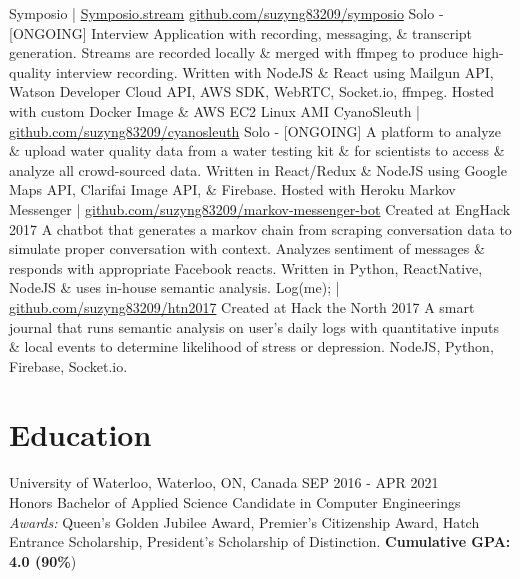 \documentclass[]{friggeri-cv}
\begin{document}
\begin{entrylist}
	\entry
	{Symposio | \href{http://symposio.stream}{\footnotesize Symposio.stream} \href{https://github.com/suzyng83209/symposio}{\footnotesize github.com/suzyng83209/symposio}}
	{\vspace{0.5\parsep}Solo - [ONGOING]}
	{Interview Application with recording, messaging, \& transcript generation. Streams are recorded locally \& merged with ffmpeg to produce high-quality interview recording. Written with NodeJS \& React using Mailgun API, Watson Developer Cloud API, AWS SDK, WebRTC, Socket.io, ffmpeg. Hosted with custom Docker Image \& AWS EC2 Linux AMI}
	\entry
	{CyanoSleuth | \href{https://github.com/suzyng83209/cyanosleuth}{\footnotesize  github.com/suzyng83209/cyanosleuth}}
	{\vspace{0.5\parsep}Solo - [ONGOING]}
	{A platform to analyze \& upload water quality data from a water testing kit \& for scientists to access \& analyze all crowd-sourced data. Written in React/Redux \& NodeJS using Google Maps API, Clarifai Image API, \& Firebase. Hosted with Heroku}
	\entry
	{Markov Messenger | \href{https://github.com/suzyng83209/markov-messenger-bot}{\footnotesize  github.com/suzyng83209/markov-messenger-bot}}
	{\vspace{0.5\parsep}Created at EngHack 2017}
	{A chatbot that generates a markov chain from scraping conversation data to simulate proper conversation with context. Analyzes sentiment of messages \& responds with appropriate Facebook reacts. Written in Python, ReactNative, NodeJS \& uses in-house semantic analysis.}
	\entry
	{Log(me); | \href{https://github.com/suzyng83209/htn2017}{\footnotesize github.com/suzyng83209/htn2017}}
	{\vspace{0.5\parsep}Created at Hack the North 2017}
	{A smart journal that runs semantic analysis on user's daily logs with quantitative inputs \& local events to determine likelihood of stress or depression. NodeJS, Python, Firebase, Socket.io.}
\end{entrylist}

\section{Education}

\begin{entrylist}
	\entry
	{University of Waterloo, Waterloo, ON, Canada \hfill{\normalfont SEP 2016 - APR 2021}}
	{\\{\normalsize\normalfont Honors Bachelor of Applied Science Candidate in Computer Engineerings}}
	{\emph{Awards:} Queen's Golden Jubilee Award, Premier's Citizenship Award, Hatch Entrance Scholarship, President's Scholarship of Distinction. \textbf{Cumulative GPA: 4.0 (90\%})}
\end{entrylist}
\end{document}
